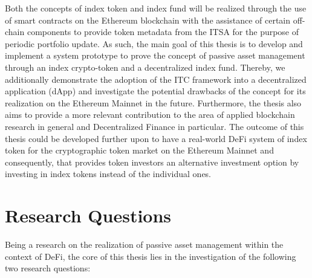 
Both the concepts of index token and index fund will be realized through the use of smart contracts on the Ethereum blockchain with the assistance of certain off-chain components to provide token metadata from the ITSA for the purpose of periodic portfolio update. As such, the main goal of this thesis is to develop and implement a system prototype to prove the concept of passive asset management through an index crypto-token and a decentralized index fund. Thereby, we additionally demonstrate the adoption of the ITC framework into a decentralized application (dApp) and investigate the potential drawbacks of the concept for its realization on the Ethereum Mainnet in the future. Furthermore, the thesis also aims to provide a more relevant contribution to the area of applied blockchain research in general and Decentralized Finance in particular. The outcome of this thesis could be developed further upon to have a real-world DeFi system of index token for the cryptographic token market on the Ethereum Mainnet and consequently, that provides token investors an alternative investment option by investing in index tokens instead of the individual ones.





\section{Research Questions}

Being a research on the realization of passive asset management within the context of DeFi, the core of this thesis lies in the investigation of the following two research questions:

